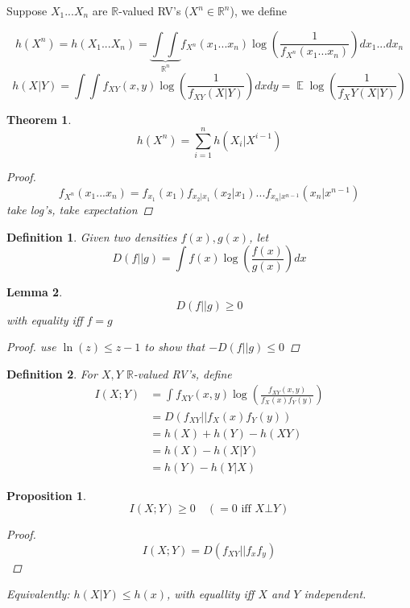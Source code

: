 \documentclass[twoside]{article}
\newtheorem{theorem}{Theorem}[section]
\newtheorem{lemma}[theorem]{Lemma}
\newtheorem{definition}{Definition}[section]
\newtheorem{proposition}{Proposition}[section]
\theoremstyle{definition} %
\def\R{\mathbb{R}}
\DeclareMathOperator{\E}{\mathbb{E}}%
\begin{document}


Suppose $X_1 ... X_n$ are $\R$-valued RV's ($X^n \in \R^n$), we define

\[
  h(X^n) = h(X_1 ... X_n) = \underbrace{\int \int}_{\R^n} f_{X^n} (x_1 ... x_n) \log(\frac{1}{f_{X^n}(x_1 ... x_n)}) dx_1...dx_n
\]
\[
  h(X|Y) = \int \int f_{XY}(x, y) \log(\frac{1}{f_{XY}(X|Y)}) dx dy = \E{\log(\frac{1}{f_XY(X | Y)})}
\]

\begin{theorem}
  \[
    h(X^n) = \sum_{i = 1}^n h(X_i | X^{i - 1})
  \]
  \begin{proof}
    \[
      f_{X^n}(x_1 ... x_n) = f_{x_1}(x_1) f_{x_2 | x_1}(x_2 | x_1) ... f_{x_n | x^{n-1}}(x_n | x^{n-1})
    \]
    take log's, take expectation
  \end{proof}
\end{theorem}

\begin{definition}
  Given two densities $f(x), g(x)$, let
  \[
    D(f || g) = \int f(x) \log(\frac{f(x)}{g(x)}) dx
  \]
\end{definition}

\begin{lemma}
  \[
    D(f || g) \geq 0
  \]
  with equality iff $f = g$
  \begin{proof}
    use $\ln(z) \leq z - 1$ to show that $-D(f||g) \leq 0$
  \end{proof}
\end{lemma}

\begin{definition}
  For $X, Y$ $\R$-valued RV's, define
  \begin{align*}
    I(X ; Y) &= \int f_{XY}(x,y) \log(\frac{f_{XY}(x, y)}{f_X(x) f_Y(y)}) \\
    &= D(f_{XY} || f_X(x) f_Y(y)) \\
    &= h(X) + h(Y) - h(XY) \\
    &= h(X) - h(X | Y) \\
    &= h(Y) - h(Y | X)
  \end{align*}
\end{definition}

\begin{proposition}
  \[
    I(X ; Y) \geq 0 \quad (=0 \text{ iff } X \bot Y)
  \]
  \begin{proof}
    \[
      I(X ; Y) = D(f_{XY} || f_x f_y)
    \]
  \end{proof}
  \textit{Equivalently}: $h(X | Y) \leq h(x)$, with equallity iff $X$ and $Y$ independent.
\end{proposition}
\end{document}
